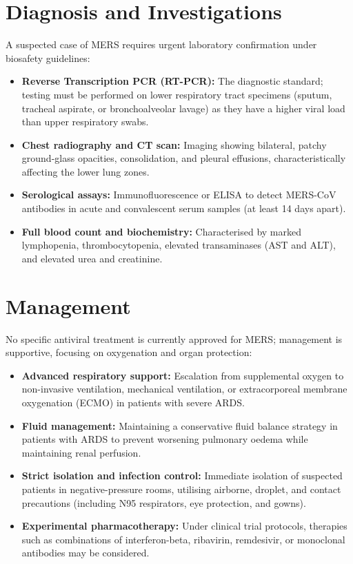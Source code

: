 \section*{Diagnosis and Investigations}
A suspected case of MERS requires urgent laboratory confirmation under biosafety guidelines:
\begin{itemize}
    \item \textbf{Reverse Transcription PCR (RT-PCR):} The diagnostic standard; testing must be performed on lower respiratory tract specimens (sputum, tracheal aspirate, or bronchoalveolar lavage) as they have a higher viral load than upper respiratory swabs.
    \item \textbf{Chest radiography and CT scan:} Imaging showing bilateral, patchy ground-glass opacities, consolidation, and pleural effusions, characteristically affecting the lower lung zones.
    \item \textbf{Serological assays:} Immunofluorescence or ELISA to detect MERS-CoV antibodies in acute and convalescent serum samples (at least 14 days apart).
    \item \textbf{Full blood count and biochemistry:} Characterised by marked lymphopenia, thrombocytopenia, elevated transaminases (AST and ALT), and elevated urea and creatinine.
\end{itemize}

\section*{Management}
No specific antiviral treatment is currently approved for MERS; management is supportive, focusing on oxygenation and organ protection:
\begin{itemize}
    \item \textbf{Advanced respiratory support:} Escalation from supplemental oxygen to non-invasive ventilation, mechanical ventilation, or extracorporeal membrane oxygenation (ECMO) in patients with severe ARDS.
    \item \textbf{Fluid management:} Maintaining a conservative fluid balance strategy in patients with ARDS to prevent worsening pulmonary oedema while maintaining renal perfusion.
    \item \textbf{Strict isolation and infection control:} Immediate isolation of suspected patients in negative-pressure rooms, utilising airborne, droplet, and contact precautions (including N95 respirators, eye protection, and gowns).
    \item \textbf{Experimental pharmacotherapy:} Under clinical trial protocols, therapies such as combinations of interferon-beta, ribavirin, remdesivir, or monoclonal antibodies may be considered.
\end{itemize}

